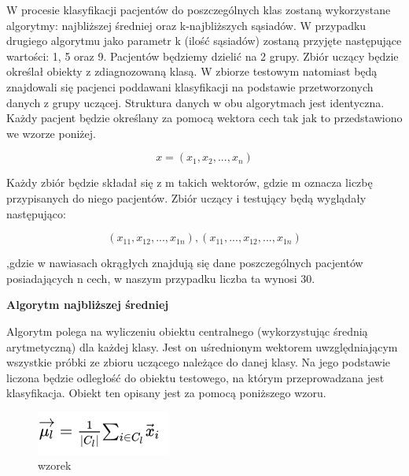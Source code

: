 \documentclass[12pt]{article}
\begin{document}
\indent W procesie klasyfikacji pacjentów do poszczególnych klas zostaną wykorzystane algorytmy: najbliższej średniej oraz k-najbliższych sąsiadów. W przypadku drugiego algorytmu jako parametr k (ilość sąsiadów) zostaną przyjęte następujące wartości: 1, 5 oraz 9. Pacjentów będziemy dzielić na 2 grupy. Zbiór uczący będzie określał obiekty z zdiagnozowaną klasą. W zbiorze testowym natomiast będą znajdowali się pacjenci poddawani klasyfikacji na podstawie przetworzonych danych z grupy uczącej. Struktura danych w obu algorytmach jest identyczna. Każdy pacjent będzie określany za pomocą wektora cech tak jak to przedstawiono we wzorze poniżej.
\begin{center}
\[ x = (x_1, x_2, ... , x_n)\]
\end{center}


Każdy zbiór będzie składał się z m takich wektorów, gdzie m oznacza liczbę przypisanych do niego pacjentów.
Zbiór uczący i testujący będą wyglądały następująco:
\begin{center}
\[ (x_{11}, x_{12}, ... , x_{1n}), (x_{11}, ..., x_{12}, ... , x_{1n})\]
\end{center}

,gdzie w nawiasach okrągłych znajdują się dane poszczególnych pacjentów posiadających n cech, w naszym przypadku liczba ta wynosi 30.
\newline \newline
\centerline{\textbf{Algorytm najbliższej średniej}}
\newline\newline
\indent Algorytm polega na wyliczeniu obiektu centralnego (wykorzystując średnią arytmetyczną) dla każdej klasy. Jest on uśrednionym wektorem uwzględniającym wszystkie próbki ze zbioru uczącego należące do danej klasy. Na jego podstawie liczona będzie odległość do obiektu testowego, na którym przeprowadzana jest klasyfikacja. Obiekt ten opisany jest za pomocą poniższego wzoru.
\begin{figure}[H]
	\centering
		\includegraphics[scale=1]{images/nm_average.png}
	\caption{wzorek}
\end{figure}
\end{document}
